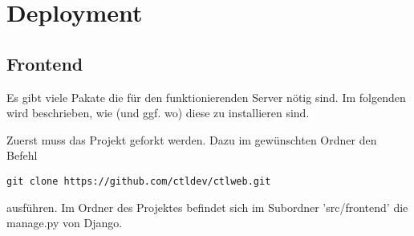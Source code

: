 \chapter{Deployment}
\section{Frontend}
Es gibt viele Pakate die für den funktionierenden Server nötig sind. Im folgenden wird beschrieben, wie (und ggf. wo) diese zu installieren sind. 

Zuerst muss das Projekt geforkt werden. Dazu im gewünschten Ordner den Befehl 
\begin{lstlisting}
git clone https://github.com/ctldev/ctlweb.git 
\end{lstlisting}
ausführen. Im Ordner des
Projektes befindet sich im Subordner 'src/frontend' die manage.py von Django.

